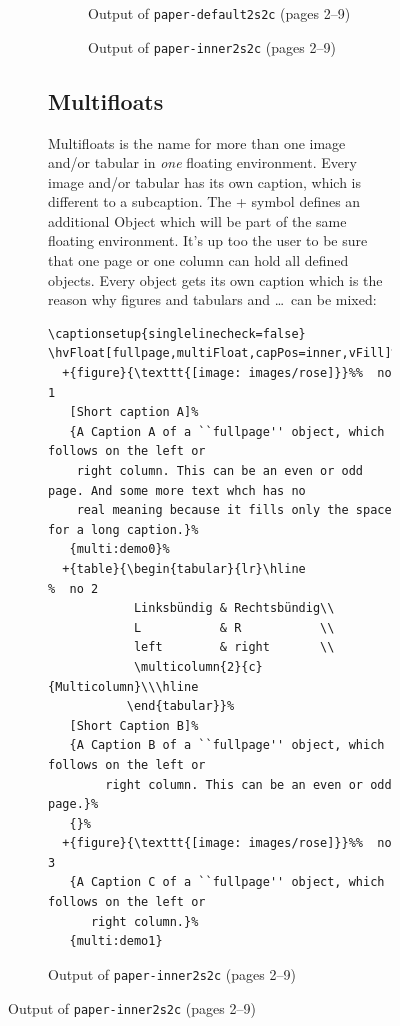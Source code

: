 \documentclass[twoside,paper=a4,usegeometry]{scrartcl}
\begin{document}
\begin{figure}[p]
\begin{figure}[p]
\begin{figure}
\caption{Output of \texttt{paper-default2s2c} (pages 2--9)}\label{paper-default2s2c}
\end{figure}


\begin{figure}
\hfill
{}\hfill
{}\hfill
{}

\hfill
{}\hfill
{}\hfill
{}

\caption{Output of \texttt{paper-inner2s2c} (pages 2--9)}\label{paper-inner2s2c}
\end{figure}


\FloatBarrier


\subsection{Multifloats}
Multifloats is the name for more than one image and/or tabular in \emph{one} floating
environment. Every image and/or tabular has its own caption, which is different to
a subcaption. 
The + symbol defines an additional Object which will be part of the same floating environment.
It's up too the user to be sure that one page or one column can hold all defined objects.
Every object gets its own caption which is the reason why figures and tabulars and \ldots\ 
can be mixed:

\begin{lstlisting}
\captionsetup{singlelinecheck=false}
\hvFloat[fullpage,multiFloat,capPos=inner,vFill]%
  +{figure}{\texttt{[image: images/rose]}}%%  no 1
   [Short caption A]%
   {A Caption A of a ``fullpage'' object, which follows on the left or
    right column. This can be an even or odd page. And some more text whch has no
    real meaning because it fills only the space for a long caption.}%
   {multi:demo0}%
  +{table}{\begin{tabular}{lr}\hline                 %  no 2
            Linksbündig & Rechtsbündig\\
            L           & R           \\
            left        & right       \\
            \multicolumn{2}{c}{Multicolumn}\\\hline
           \end{tabular}}%
   [Short Caption B]%
   {A Caption B of a ``fullpage'' object, which follows on the left or
        right column. This can be an even or odd page.}%
   {}%
  +{figure}{\texttt{[image: images/rose]}}%%  no 3
   {A Caption C of a ``fullpage'' object, which follows on the left or
      right column.}%
   {multi:demo1}
\end{lstlisting}




\end{figure}
\end{figure}
\end{document}
